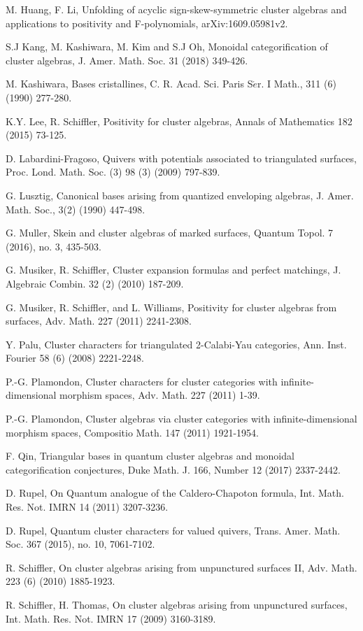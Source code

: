 \documentclass[10pt]{amsart}
\theoremstyle{theorems}
\begin{document}
\begin{thebibliography}{abcdsfgh}
 M. Huang, F. Li, Unfolding of acyclic sign-skew-symmetric cluster algebras and applications to positivity and F-polynomials, arXiv:1609.05981v2.

 S.J Kang, M. Kashiwara, M. Kim and S.J Oh, Monoidal categorification of cluster algebras, J. Amer. Math. Soc. 31 (2018) 349-426.

 M. Kashiwara, Bases cristallines, C. R. Acad. Sci. Paris S$\acute{e}$r. I Math., 311 (6) (1990) 277-280.

 K.Y. Lee, R. Schiffler, Positivity for cluster algebras, Annals of Mathematics 182 (2015) 73-125.

 D. Labardini-Fragoso, Quivers with potentials associated to triangulated surfaces, Proc. Lond. Math. Soc. (3) 98 (3) (2009) 797-839.

 G. Lusztig, Canonical bases arising from quantized enveloping algebras, J. Amer. Math. Soc., 3(2) (1990) 447-498.

  G. Muller, Skein and cluster algebras of marked surfaces, Quantum Topol. 7 (2016), no. 3, 435-503.

 G. Musiker, R. Schiffler, Cluster expansion formulas and perfect matchings, J. Algebraic Combin. 32 (2) (2010) 187-209.

 G. Musiker, R. Schiffler, and L. Williams, Positivity for cluster algebras from surfaces, Adv. Math. 227 (2011) 2241-2308.

 Y. Palu, Cluster characters for triangulated 2-Calabi-Yau categories, Ann. Inst. Fourier 58 (6) (2008) 2221-2248.

 P.-G. Plamondon, Cluster characters for cluster categories with infinite-dimensional morphism spaces, Adv. Math. 227 (2011) 1-39. 				

 P.-G. Plamondon, Cluster algebras via cluster categories with infinite-dimensional morphism spaces, Compositio Math. 147 (2011) 1921-1954.

 F. Qin, Triangular bases in quantum cluster algebras and monoidal categorification conjectures, Duke Math. J. 166, Number 12 (2017) 2337-2442.

 D. Rupel, On Quantum analogue of the Caldero-Chapoton formula, Int. Math. Res. Not. IMRN 14 (2011) 3207-3236.

 D. Rupel, Quantum cluster characters for valued quivers, Trans. Amer. Math. Soc. 367 (2015), no. 10, 7061-7102.

 R. Schiffler, On cluster algebras arising from unpunctured surfaces II, Adv. Math. 223 (6) (2010) 1885-1923.

 R. Schiffler, H. Thomas, On cluster algebras arising from unpunctured surfaces, Int. Math. Res. Not. IMRN 17 (2009) 3160-3189.

\end{thebibliography}
\end{document}
